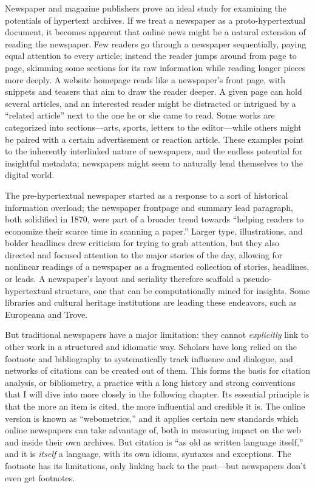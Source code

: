 
Newspaper and magazine publishers prove an ideal study for examining the potentials of hypertext archives. If we treat a newspaper as a proto-hypertextual document, it becomes apparent that online news might be a natural extension of reading the newspaper. Few readers go through a newspaper sequentially, paying equal attention to every article; instead the reader jumps around from page to page, skimming some sections for its raw information while reading longer pieces more deeply. A website homepage reads like a newspaper's front page, with snippets and teasers that aim to draw the reader deeper. A given page can hold several articles, and an interested reader might be distracted or intrigued by a ``related article'' next to the one he or she came to read. Some works are categorized into sections---arts, sports, letters to the editor---while others might be paired with a certain advertisement or reaction article. These examples point to the inherently interlinked nature of newspapers, and the endless potential for insightful metadata; newspapers might seem to naturally lend themselves to the digital world.

The pre-hypertextual newspaper started as a response to a sort of historical information overload; the newspaper frontpage and summary lead paragraph, both solidified in 1870, were part of a broader trend towards ``helping readers to economize their scarce time in scanning a paper.''\autocite[254]{starr_creation_2004} Larger type, illustrations, and bolder headlines drew criticism for trying to grab attention, but they also directed and focused attention to the major stories of the day, allowing for nonlinear readings of a newspaper as a fragmented collection of stories, headlines, or leads. A newspaper's layout and seriality therefore scaffold a pseudo-hypertextual structure, one that can be computationally mined for insights. Some libraries and cultural heritage institutions are leading these endeavors, such as Europeana and Trove.\autocite{europeana,trove}

But traditional newspapers have a major limitation: they cannot \emph{explicitly} link to other work in a structured and idiomatic way. Scholars have long relied on the footnote and bibliography to systematically track influence and dialogue, and networks of citations can be created out of them. %
This forms the basis for citation analysis, or bibliometry, a practice with a long history and strong conventions that I will dive into more closely in the following chapter. Its essential principle is that the more an item is cited, the more influential and credible it is. The online version is known as ``webometrics,'' and it applies certain new standards which online newspapers can take advantage of, both in measuring impact on the web and inside their own archives. But citation is ``as old as written language itself,'' and it is \emph{itself} a language, with its own idioms, syntaxes and exceptions.\autocite[1]{chakrabarti_mining_2003} The footnote has its limitations, only linking back to the past---but newspapers don't even get footnotes.

